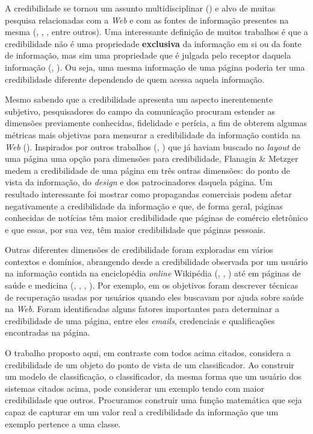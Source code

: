 A credibilidade se tornou um assunto multidisciplinar (\cite{Rieh07}) e alvo de muitas pesquisa relacionadas com a \textit{Web} e com as fontes de informação presentes na mesma (\cite{Sundar99}, \cite{Freeman04}, \cite{Flanagin07}, entre outros).
Uma interessante definição de muitos trabalhos é que a credibilidade não é uma propriedade \textbf{exclusiva} da informação em si ou da fonte de informação, mas sim uma propriedade que é julgada pelo receptor daquela informação (\cite{Sundar99}, \cite{Freeman04}). Ou seja, uma mesma informação de uma página poderia ter uma credibilidade diferente dependendo de quem acessa aquela informação.

Mesmo sabendo que a credibilidade apresenta um aspecto inerentemente subjetivo, pesquisadores do campo da comunicação procuram estender as dimensões previamente conhecidas, fidelidade e perícia, a fim de obterem algumas métricas mais objetivas para mensurar a credibilidade da informação contida na \textit{Web} (\cite{Flanagin07}). 
Inspirados por outros trabalhos
(\cite{Palmer00}, \cite{Fogg01})
que já haviam buscado no \textit{layout} de uma página uma opção para dimensões para credibilidade, Flanagin \& Metzger medem a credibilidade de uma página em três outras dimensões: do ponto de vista da informação, do \textit{design} e dos patrocinadores daquela página. Um resultado interessante foi mostrar como propagandas comerciais podem afetar negativamente a credibilidade da informação e que, de forma geral, páginas conhecidas de notícias têm maior credibilidade que páginas de comércio eletrônico e que essas, por sua vez, têm maior credibilidade que páginas pessoais.

Outras diferentes dimensões de credibilidade foram exploradas em vários contextos e domínios, abrangendo desde a credibilidade observada por um usuário na informação contida na enciclopédia \textit{online} Wikipédia (\cite{Chesney06}, \cite{Lopes08}, \cite{Kubiszewski11}) até em páginas de saúde e medicina (\cite{Linderg98}, \cite{Eastin01}, \cite{Eysenbach02}, \cite{Rains09}). Por exemplo, em \cite{Eysenbach02} os objetivos foram descrever técnicas de recuperação usadas por usuários quando eles buscavam por ajuda sobre saúde na \textit{Web}. Foram identificadas alguns fatores importantes para determinar a credibilidade de uma página, entre eles \textit{emails}, credenciais e qualificações encontradas na página.

O trabalho proposto aqui, em contraste com todos acima citados, considera a credibilidade de um objeto do ponto de vista de um classificador. Ao construir um modelo de classificação, o classificador, da mesma forma que um usuário dos sistemas citados acima, pode considerar um exemplo tendo com maior credibilidade que outros. Procuramos construir uma função matemática que seja capaz de capturar em um valor real a credibilidade da informação que um exemplo pertence a uma classe. 

